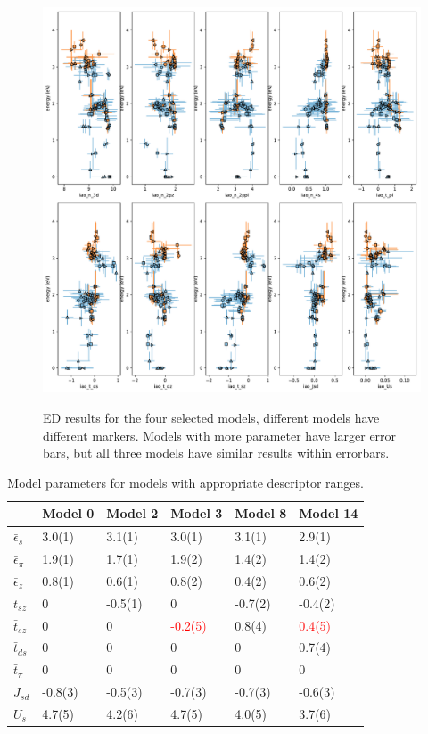 \documentclass{article}
\begin{document}
\begin{figure}[H]
\centering
\includegraphics[width=0.9\linewidth]{../qwalk/ub3lyp_s1_/analysis/ed_combined_log.pdf}
\label{fig:ED_comp}
\caption{ED results for the four selected models, different models have different markers. Models with more parameter have larger error bars, but all three models have similar results within errorbars.}
\end{figure}


\begin{table}[H]
\centering
\begin{tabular}{l|lllll}
    & Model 0 & Model 2 & Model 3 & Model 8 & Model 14 \\ \hline
$\bar{\epsilon}_s$  & 3.0(1)  & 3.1(1)  & 3.0(1)  & 3.1(1)  & 2.9(1)   \\
$\bar{\epsilon}_\pi$ & 1.9(1)  & 1.7(1)  & 1.9(2)  & 1.4(2)  & 1.4(2)   \\
$\bar{\epsilon}_z$ & 0.8(1)  & 0.6(1)  & 0.8(2)  & 0.4(2)  & 0.6(2)   \\
$\bar{t}_{sz}$& 0       & -0.5(1) & 0       & -0.7(2) & -0.4(2)  \\
$\bar{t}_{sz}$& 0       & 0       & \textcolor{red}{-0.2(5)} & 0.8(4)  & \textcolor{red}{0.4(5)}   \\
$\bar{t}_{ds}$& 0       & 0       & 0       & 0       & 0.7(4)   \\
$\bar{t}_{\pi}$& 0       & 0       & 0       & 0       & 0        \\
$J_{sd}$ & -0.8(3) & -0.5(3) & -0.7(3) & -0.7(3) & -0.6(3)  \\
$U_s$  & 4.7(5)  & 4.2(6)  & 4.7(5)  & 4.0(5)  & 3.7(6)  
\end{tabular}
\label{fig:Table1}
\caption{Model parameters for models with appropriate descriptor ranges.}
\end{table}
\end{document}
